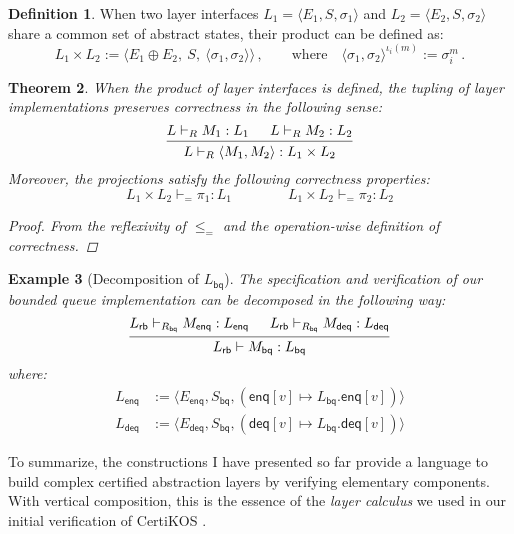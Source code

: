 \documentclass[11pt,oneside]{book}
\newtheorem{theorem}{Theorem}[chapter]
\newtheorem{example}[theorem]{Example}
\theoremstyle{definition}
\newtheorem{definition}[theorem]{Definition}
\newcommand{\kw}[1]{\ensuremath{ \mathsf{#1} }}
\begin{document}
\begin{definition}
When two layer interfaces
$L_1 = \langle E_1, S, \sigma_1 \rangle$ and
$L_2 = \langle E_2, S, \sigma_2 \rangle$
share a common set of abstract states,
their product can be defined as:
\[
  L_1 \times L_2 :=
    \langle
      E_1 \oplus E_2, \:
      S, \:
      \langle \sigma_1, \sigma_2 \rangle
    \rangle \,,
  \qquad
  \text{where}
  \quad
  \langle \sigma_1, \sigma_2 \rangle^{\iota_i(m)} := \sigma_i^m \,.
\]
\end{definition}

\begin{theorem}
When the product of layer interfaces is defined,
the tupling of layer implementations
preserves correctness in the following sense:
\[
  \begin{prooftree}
    \hypo{L \vdash_R M_1 : L_1}
    \hypo{L \vdash_R M_2 : L_2}
    \infer2{L \vdash_R \langle M_1, M_2 \rangle : L_1 \times L_2}
  \end{prooftree}
\]
Moreover, the projections satisfy the following correctness properties:
\[
   L_1 \times L_2 \vdash_{=} \pi_1 : L_1 \qquad \qquad
   L_1 \times L_2 \vdash_{=} \pi_2 : L_2
\]
\begin{proof}
From the reflexivity of $\le_=$ and
the operation-wise definition of correctness.
\end{proof}
\end{theorem}

\begin{example}[Decomposition of $L_\kw{bq}$]
The specification and verification of
our bounded queue implementation can be decomposed
in the following way:
\[
  \begin{prooftree}
    \hypo{L_\kw{rb} \vdash_{R_\kw{bq}} M_\kw{enq} : L_\kw{enq}}
    \hypo{L_\kw{rb} \vdash_{R_\kw{bq}} M_\kw{deq} : L_\kw{deq}}
    \infer2{L_\kw{rb} \vdash M_\kw{bq} : L_\kw{bq}}
  \end{prooftree}
\]
where:
\begin{align*}
  L_\kw{enq} &:=
    \langle E_\kw{enq}, S_\kw{bq},
      (\kw{enq}[v] \mapsto L_\kw{bq}.\kw{enq}[v]) \rangle \\
  L_\kw{deq} &:=
    \langle E_\kw{deq}, S_\kw{bq},
      (\kw{deq}[v] \mapsto L_\kw{bq}.\kw{deq}[v]) \rangle
\end{align*}
\end{example}

To summarize,
the constructions I have presented so far
provide a language to build
complex certified abstraction layers
by verifying elementary components.
With vertical composition,
this is the essence of the \emph{layer calculus}
we used in our initial verification of CertiKOS
\citep{popl15}.
\end{document}
